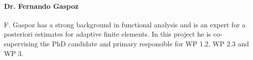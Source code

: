 \documentclass[enabledeprecatedfontcommands,cleardoublepage=empty,headsepline,twoside,11pt,DIV=15,BCOR=12mm,final]{scrartcl}
\newcommand{\ppdes}{\textsf{pPDEs}\xspace}
\begin{document}
\paragraph{Dr. Fernando Gaspoz}  F. Gaspoz has a strong background in functional analysis and is an expert for a posteriori estimates for adaptive finite elements. In this project he is co-supervising the PhD candidate and primary responsible for WP 1.2, WP 2.3 and WP 3. 

 
%


\end{document}
